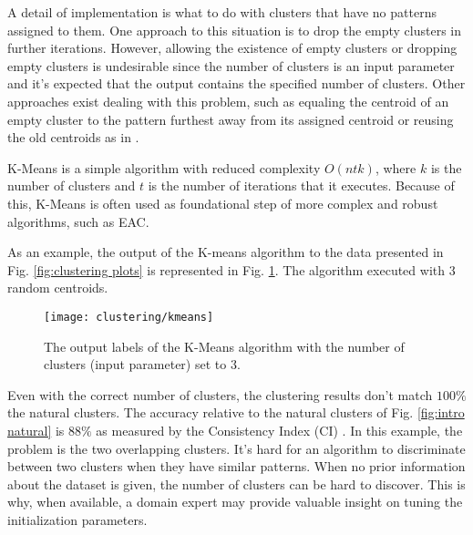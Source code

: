 A detail of implementation is what to do with clusters that have no patterns assigned to them.
One approach to this situation is to drop the empty clusters in further iterations.
However, allowing the existence of empty clusters or dropping empty clusters is undesirable since the number of clusters is an input parameter and it's expected that the output contains the specified number of clusters.
Other approaches exist dealing with this problem, such as equaling the centroid of an empty cluster to the pattern furthest away from its assigned centroid or reusing the old centroids as in \cite{Pakhira2009}.

K-Means is a simple algorithm with reduced complexity $O(ntk)$, where $k$ is the number of clusters and $t$ is the number of iterations that it executes.
Because of this, K-Means is often used as foundational step of more complex and robust algorithms, such as EAC.




As an example, the output of the K-means algorithm to the data presented in Fig. \ref{fig:clustering plots} is represented in Fig. \ref{fig:intro kmeans}.
The algorithm executed with 3 random centroids.

\begin{figure}[hbtp]
    \centering
    \texttt{[image: clustering/kmeans]}
    \caption{The output labels of the K-Means algorithm with the number of clusters (input parameter) set to 3.}
    \label{fig:intro kmeans}
\end{figure}

Even with the correct number of clusters, the clustering results don't match $100\%$ the natural clusters.
The accuracy relative to the natural clusters of Fig. \ref{fig:intro natural} is $88\%$ as measured by the Consistency Index (CI) \cite{Fred2001}.
In this example, the problem is the two overlapping clusters.
It's hard for an algorithm to discriminate between two clusters when they have similar patterns.
When no prior information about the dataset is given, the number of clusters can be hard to discover.
This is why, when available, a domain expert may provide valuable insight on tuning the initialization parameters.

